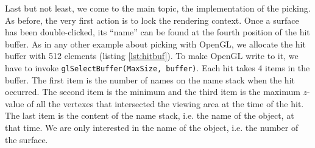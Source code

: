 \documentclass[jou,noapacite]{apa}
\begin{document}
Last but not least, we come to the main topic, the implementation of the picking.
%
As before, the very first action is to lock the rendering context.
%
Once a surface has been double-clicked, its ``name'' can be found at the fourth
position of the hit buffer.
%
As in any other example about picking with OpenGL, we allocate the hit buffer
with 512 elements (listing \ref{lst:hitbuf}).
%
To make OpenGL write to it, we have to invoke \lstinline|glSelectBuffer(MaxSize, buffer)|.
Each hit takes 4 items in the buffer.
%
The first item is the number of names on the name stack when the hit occurred.
%
The second item is the minimum and the third item is the maximum $z$-value of
all the vertexes that intersected the viewing area at the time of the hit.
%
The last item is the content of the name stack, i.e. the name of the object,
at that time.
%
We are only interested in the name of the object, i.e. the number of the
surface.
\end{document}
